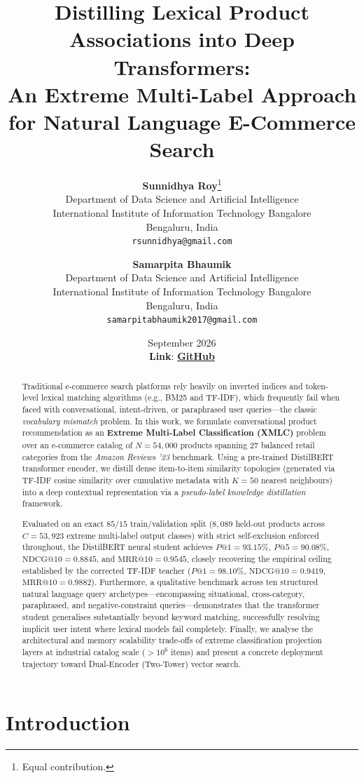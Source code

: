 \documentclass[11pt]{article}
\title{\textbf{Distilling Lexical Product Associations into Deep Transformers:\\
An Extreme Multi-Label Approach for Natural Language E-Commerce Search}}
\author{
  \textbf{Sunnidhya Roy}\thanks{Equal contribution.}\\
  Department of Data Science and Artificial Intelligence\\
  International Institute of Information Technology Bangalore\\
  Bengaluru, India\\
  \texttt{rsunnidhya@gmail.com}
  \and
  \textbf{Samarpita Bhaumik}\footnotemark[1]\\
  Department of Data Science and Artificial Intelligence\\
  International Institute of Information Technology Bangalore\\
  Bengaluru, India\\
  \texttt{samarpitabhaumik2017@gmail.com}
}
\date{September 2026\\[1ex]
\textbf{Link}: \href{https://github.com/Sunnidhya/Distilling-Lexical-Product-Associations-into-Deep-Transformers}{\textbf{GitHub}}}
\begin{document}
\maketitle

\begin{abstract}
Traditional e-commerce search platforms rely heavily on inverted indices and token-level lexical matching algorithms (e.g., BM25 and TF-IDF), which frequently fail when faced with conversational, intent-driven, or paraphrased user queries---the classic \emph{vocabulary mismatch} problem. In this work, we formulate conversational product recommendation as an \textbf{Extreme Multi-Label Classification (XMLC)} problem over an e-commerce catalog of $N = 54{,}000$ products spanning 27 balanced retail categories from the \textit{Amazon Reviews '23} benchmark. Using a pre-trained DistilBERT transformer encoder, we distill dense item-to-item similarity topologies (generated via TF-IDF cosine similarity over cumulative metadata with $K = 50$ nearest neighbours) into a deep contextual representation via a \emph{pseudo-label knowledge distillation} framework.

Evaluated on an exact $85/15$ train/validation split ($8{,}089$ held-out products across $C = 53{,}923$ extreme multi-label output classes) with strict self-exclusion enforced throughout, the DistilBERT neural student achieves $P@1 = 93.15\%$, $P@5 = 90.08\%$, $\text{NDCG}@10 = 0.8845$, and $\text{MRR}@10 = 0.9545$, closely recovering the empirical ceiling established by the corrected TF-IDF teacher ($P@1 = 98.10\%$, $\text{NDCG}@10 = 0.9419$, $\text{MRR}@10 = 0.9882$). Furthermore, a qualitative benchmark across ten structured natural language query archetypes---encompassing situational, cross-category, paraphrased, and negative-constraint queries---demonstrates that the transformer student generalises substantially beyond keyword matching, successfully resolving implicit user intent where lexical models fail completely. Finally, we analyse the architectural and memory scalability trade-offs of extreme classification projection layers at industrial catalog scale ($>10^6$ items) and present a concrete deployment trajectory toward Dual-Encoder (Two-Tower) vector search.
\end{abstract}

\section{Introduction}
\end{document}
